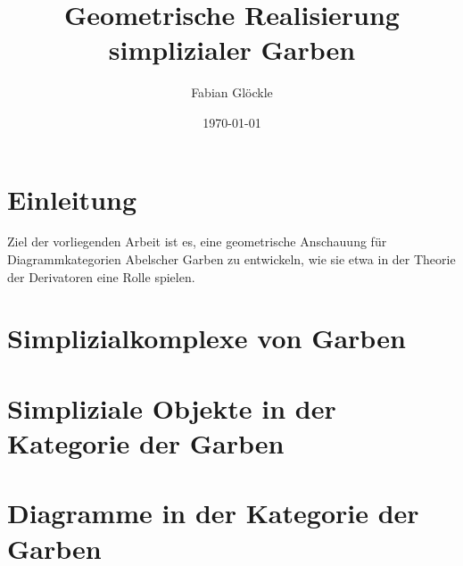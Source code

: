 \documentclass[a4paper]{article}
\begin{document}
\title{Geometrische Realisierung simplizialer Garben}
\author{Fabian Glöckle}
\date{\today}
\maketitle

\section{Einleitung}

Ziel der vorliegenden Arbeit ist es, eine geometrische Anschauung für
Diagrammkategorien Abelscher Garben zu entwickeln, wie sie etwa in der
Theorie der Derivatoren eine Rolle spielen.

\section{Simplizialkomplexe von Garben}

\section{Simpliziale Objekte in der Kategorie der Garben}

\section{Diagramme in der Kategorie der Garben}

\begin{thebibliography}{9}


\end{thebibliography}
\end{document}
